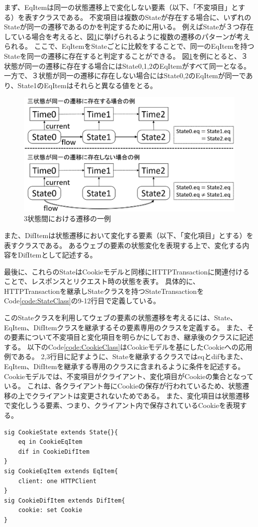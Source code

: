 \documentclass[12pt,a4paper]{jbook}
\begin{document}
まず、EqItemは同一の状態遷移上で変化しない要素（以下、「不変項目」とする）を表すクラスである。
不変項目は複数のStateが存在する場合に、いずれのStateが同一の遷移であるのかを判定するために用いる。
例えばStateが３つ存在している場合を考えると、図\ref{fig:ProposedModel-3StateFlow}に挙げられるように複数の遷移のパターンが考えられる。
ここで、EqItemをStateごとに比較をすることで、同一のEqItemを持つStateを同一の遷移に存在すると判定することができる。
図\ref{fig:ProposedModel-3StateFlow}を例にとると、３状態が同一の遷移に存在する場合にはState0,1,2のEqItemがすべて同一となる。
一方で、３状態が同一の遷移に存在しない場合にはState0,2のEqItemが同一であり、State1のEqItemはそれらと異なる値をとる。

\begin{figure}[htb]
\centering
\includegraphics[width=400pt]{./fig/ProposedModel-3StateFlow.eps}
\caption{3状態間における遷移の一例}
\label{fig:ProposedModel-3StateFlow}
\end{figure}

また、DifItemは状態遷移において変化する要素（以下、「変化項目」とする）を表すクラスである。
あるウェブの要素の状態変化を表現する上で、変化する内容をDifItemとして記述する。

最後に、これらのStateはCookieモデルと同様にHTTPTransactionに関連付けることで、レスポンスとリクエスト時の状態を表す。
具体的に、HTTPTransactionを継承しStateクラスを持つStateTransactionをCode\ref{code:StateClass}の9-12行目で定義している。

このStateクラスを利用してウェブの要素の状態遷移を考えるには、State、EqItem、DifItemクラスを継承するその要素専用のクラスを定義する。
また、その要素について不変項目と変化項目を明らかにしておき、継承後のクラスに記述する。
以下のCode\ref{code:CookieClass}はCookieモデルを基にしたCookieへの応用例である。
2,3行目に記すように、Stateを継承するクラスではeqとdifもまた、EqItem、DifItemを継承する専用のクラスに含まれるように条件を記述する。
Cookieモデルでは、不変項目がクライアント、変化項目がCookieの集合となっている。
これは、各クライアント毎にCookieの保存が行われているため、状態遷移の上でクライアントは変更されないためである。
また、変化項目は状態遷移で変化しうる要素、つまり、クライアント内で保存されているCookieを表現する。
\begin{lstlisting}[caption=Cookieへの応用例, label=code:CookieClass]
sig CookieState extends State{}{
	eq in CookieEqItem
	dif in CookieDifItem
}
sig CookieEqItem extends EqItem{
	client: one HTTPClient
}
sig CookieDifItem extends DifItem{
	cookie: set Cookie
}
\end{lstlisting}
\end{document}
